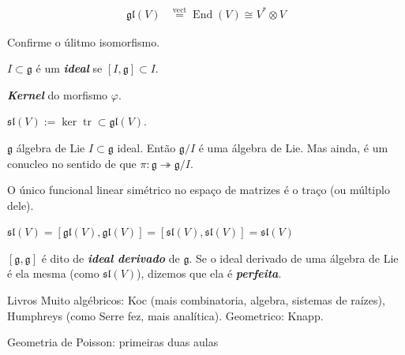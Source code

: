 \begin{align*}
\mathfrak{gl}(V)&\overset{\operatorname{vect}}{=}\operatorname{End}(V)\cong V^* \otimes V
\end{align*}
\begin{exercise}\leavevmode
Confirme o úlitmo isomorfismo.
\end{exercise}
\begin{defn}\leavevmode
	\(I \subset \mathfrak{g}\) é um \textit{\textbf{ideal}} se \([I,\mathfrak{g}] \subset I\).
\end{defn}

\begin{defn}\leavevmode
\textit{\textbf{Kernel}} do morfismo \(\varphi\).
\end{defn}
\begin{defn}\leavevmode
\(\mathfrak{sl}(V):=\ker \operatorname{tr} \subset \mathfrak{gl}(V)\).
\end{defn}
\begin{lemma}\leavevmode
\(\mathfrak{g}\) álgebra de Lie \(I \subset \mathfrak{g}\) ideal. Então \(\mathfrak{g}/I\) é uma álgebra de Lie. Mas ainda, é um conucleo no sentido de que \(\pi:\mathfrak{g} \twoheadrightarrow \mathfrak{g}/I\).
\end{lemma}
\begin{prop}\leavevmode
O único funcional  linear simétrico no espaço de matrizes é o traço (ou múltiplo dele).
\end{prop}
\begin{coro}\leavevmode
	\(\mathfrak{sl}(V)=[\mathfrak{gl}(V),\mathfrak{gl}(V)]=[\mathfrak{sl}(V),\mathfrak{sl}(V)]=\mathfrak{sl}(V)\)
\end{coro}
\begin{defn}\leavevmode
	\([\mathfrak{g},\mathfrak{g}]\) é dito de \textit{\textbf{ideal derivado}} de  \(\mathfrak{g}\). Se o ideal derivado de uma álgebra de Lie é ela mesma (como \(\mathfrak{sl}(V)\)), dizemos que ela é \textit{\textbf{perfeita}}.
\end{defn}
\begin{thing7}{Livros}\leavevmode
Muito algébricos: Koc (mais combinatoria, algebra, sistemas de raízes), Humphreys (como Serre fez, mais analítica). Geometrico: Knapp.
\end{thing7}

\clearpage{}
{\Huge Geometria de Poisson: primeiras duas aulas}

